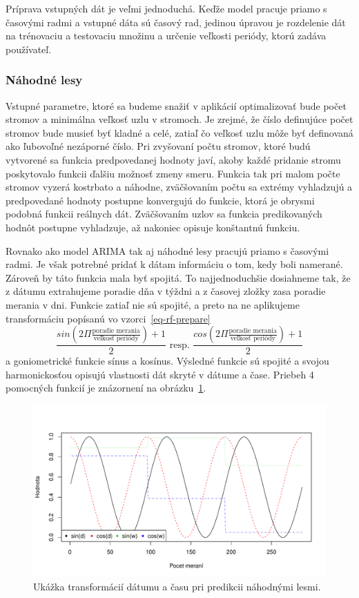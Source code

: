 \documentclass[a4paper,slovak,12pt,appendix]{article}
\begin{document}
Príprava vstupných dát je veľmi jednoduchá. Keďže model pracuje priamo
s časovými radmi a vstupné dáta sú časový rad, jedinou úpravou je rozdelenie dát
na trénovaciu a testovaciu množinu a určenie veľkosti periódy, ktorú zadáva
používateľ.

\subsubsection{Náhodné lesy}
Vstupné parametre, ktoré sa budeme snažiť v aplikácií optimalizovať bude počet
stromov a minimálna veľkosť uzlu v stromoch. Je zrejmé, že číslo definujúce
počet stromov bude musieť byť kladné a celé, zatiaľ čo veľkosť uzlu môže byť
definovaná ako ľubovoľné nezáporné číslo. Pri zvyšovaní počtu stromov, ktoré
budú vytvorené sa funkcia predpovedanej hodnoty javí, akoby každé pridanie stromu
poskytovalo funkcii ďalšiu možnosť zmeny smeru. Funkcia tak pri malom počte
stromov vyzerá kostrbato a náhodne, zväčšovaním počtu sa extrémy vyhladzujú a
predpovedané hodnoty postupne konvergujú do funkcie, ktorá je obrysmi podobná
funkcii reálnych dát. Zväčšovaním uzlov sa funkcia predikovaných hodnôt
postupne vyhladzuje, až nakoniec opisuje konštantnú funkciu.

Rovnako ako model ARIMA tak aj náhodné lesy pracujú priamo s časovými radmi.
Je však potrebné pridať k dátam informáciu o tom, kedy boli namerané. Zároveň
by táto funkcia mala byť spojitá. To najjednoduchšie dosiahneme tak, že z dátumu
extrahujeme poradie dňa v týždni a z časovej zložky zasa poradie merania v dni.
Funkcie zatiaľ nie sú spojité, a preto na ne aplikujeme transformáciu popísanú
vo vzorci~\ref{eq-rf-prepare}~\cite{Laurinec2017}
\begin{equation}
  \frac{sin(2\Pi \frac{\text{poradie merania}}{\text{veľkosť periódy}}) + 1}{2} \text{  resp.  } \frac{cos(2\Pi \frac{\text{poradie merania}}{\text{veľkosť periódy}}) + 1}{2}
  \label{eq-rf-prepare}
\end{equation}
a goniometrické funkcie sínus a kosínus. Výsledné funkcie sú spojité a svojou
harmonickosťou opisujú vlastnosti dát skryté v dátume a čase. Priebeh 4 pomocných
funkcií je znázornení na obrázku~\ref{fig-rf-prepare}.

\begin{figure}[ht]
  \centering
  \includegraphics[width=\textwidth]{random_forest_preparation.pdf}
  \caption{Ukážka transformácií dátumu a času pri predikcii náhodnými lesmi.}
  \label{fig-rf-prepare}
\end{figure}
\end{document}
